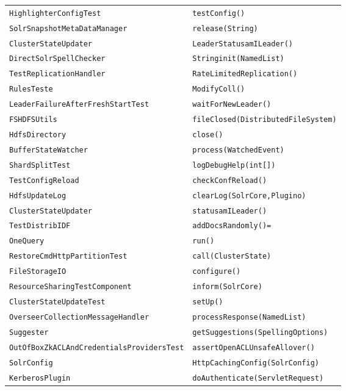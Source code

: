 \begin{center}
\begin{longtable}{ll}
\lstinline/HighlighterConfigTest/&{\lstinline/testConfig()/}\\
\lstinline/SolrSnapshotMetaDataManager/&{\lstinline/release(String)/}\\
\lstinline/ClusterStateUpdater/&{\lstinline/LeaderStatusamILeader()/}\\
\lstinline/DirectSolrSpellChecker/&{\lstinline/Stringinit(NamedList)/}\\
\lstinline/TestReplicationHandler/&{\lstinline/RateLimitedReplication()/}\\
\lstinline/RulesTeste/&{\lstinline/ModifyColl()/}\\
\lstinline/LeaderFailureAfterFreshStartTest/&{\lstinline/waitForNewLeader()/}\\
\lstinline/FSHDFSUtils/&{\lstinline/fileClosed(DistributedFileSystem)/}\\
\lstinline/HdfsDirectory/&{\lstinline/close()/}\\
\lstinline/BufferStateWatcher/&{\lstinline/process(WatchedEvent)/}\\
\lstinline/ShardSplitTest/&{\lstinline/logDebugHelp(int[])/}\\
\lstinline/TestConfigReload/&{\lstinline/checkConfReload()/}\\
\lstinline/HdfsUpdateLog/&{\lstinline/clearLog(SolrCore,Plugino)/}\\
\lstinline/ClusterStateUpdater/&{\lstinline/statusamILeader()/}\\
\lstinline/TestDistribIDF/&{\lstinline/addDocsRandomly()=/}\\
\lstinline/OneQuery/&{\lstinline/run()/}\\
\lstinline/RestoreCmdHttpPartitionTest/&{\lstinline/call(ClusterState)/}\\
\lstinline/FileStorageIO/&{\lstinline/configure()/}\\
\lstinline/ResourceSharingTestComponent/&{\lstinline/inform(SolrCore)/}\\
\lstinline/ClusterStateUpdateTest/&{\lstinline/setUp()/}\\
\lstinline/OverseerCollectionMessageHandler/&{\lstinline/processResponse(NamedList)/}\\
\lstinline/Suggester/&{\lstinline/getSuggestions(SpellingOptions)/}\\
\lstinline/OutOfBoxZkACLAndCredentialsProvidersTest/&{\lstinline/assertOpenACLUnsafeAllover()/}\\
\lstinline/SolrConfig/&{\lstinline/HttpCachingConfig(SolrConfig)/}\\
\lstinline/KerberosPlugin/&{\lstinline/doAuthenticate(ServletRequest)/}\\

\end{longtable}
\end{center}
